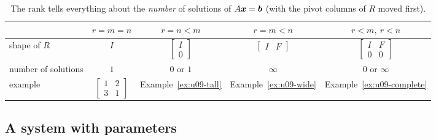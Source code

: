 \begin{table}[ht]\centering
\begin{tabular}{@{}lcccc@{}}
\toprule
 & $r=m=n$ & $r=n<m$ & $r=m<n$ & $r<m,\ r<n$\\
\midrule
shape of $R$ & $I$ & $\begin{bmatrix}I\\0\end{bmatrix}$ & $\begin{bmatrix}I&F\end{bmatrix}$ & $\begin{bmatrix}I&F\\0&0\end{bmatrix}$\\[10pt]
number of solutions & $1$ & $0$ or $1$ & $\infty$ & $0$ or $\infty$\\
example & $\begin{bmatrix}1&2\\3&1\end{bmatrix}$ & Example~\ref{ex:u09-tall} & Example~\ref{ex:u09-wide} & Example~\ref{ex:u09-complete}\\
\bottomrule
\end{tabular}
\caption{The rank tells everything about the \emph{number} of solutions of $A\boldsymbol{x}=\boldsymbol{b}$
(with the pivot columns of $R$ moved first).}
\label{tab:u09-cases}
\end{table}

\subsection{A system with parameters}

